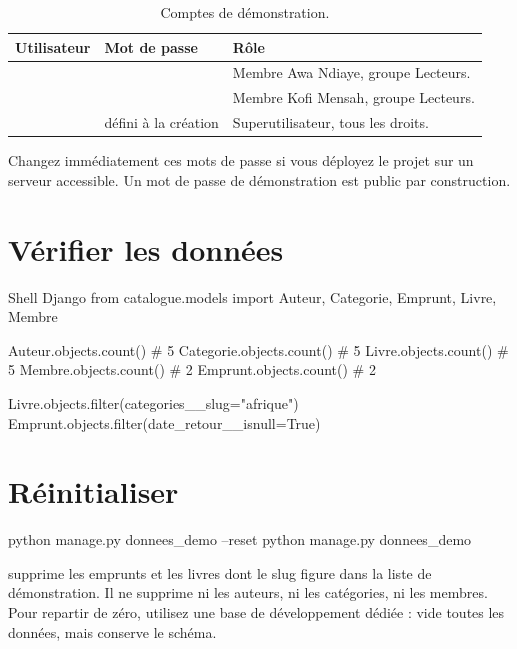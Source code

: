 \begin{table}[htbp]
\centering
\small
\begin{tabularx}{\textwidth}{L{3.4cm} L{4.4cm} X}
\toprule
\textbf{Utilisateur} & \textbf{Mot de passe} & \textbf{Rôle} \\
\midrule
{} &  & Membre Awa Ndiaye, groupe
Lecteurs. \\
 &  & Membre Kofi Mensah, groupe
Lecteurs. \\
 & défini à la création & Superutilisateur, tous les droits. \\
\bottomrule
\end{tabularx}
\caption{Comptes de démonstration.}
\end{table}

\begin{attention}
Changez immédiatement ces mots de passe si vous déployez le projet sur un serveur
accessible. Un mot de passe de démonstration est public par construction.
\end{attention}

\section{Vérifier les données}

\begin{codebox}[python]{Shell Django}
from catalogue.models import Auteur, Categorie, Emprunt, Livre, Membre

Auteur.objects.count()        # 5
Categorie.objects.count()     # 5
Livre.objects.count()         # 5
Membre.objects.count()        # 2
Emprunt.objects.count()       # 2

Livre.objects.filter(categories__slug="afrique")
Emprunt.objects.filter(date_retour__isnull=True)
\end{codebox}

\section{Réinitialiser}

\begin{terminal}
python manage.py donnees_demo --reset
python manage.py donnees_demo
\end{terminal}

\begin{attention}
 supprime les emprunts et les livres dont le slug figure dans la
liste de démonstration. Il ne supprime ni les auteurs, ni les catégories, ni les
membres. Pour repartir de zéro, utilisez une base de développement dédiée :
 vide toutes les données, mais conserve le schéma.
\end{attention}

